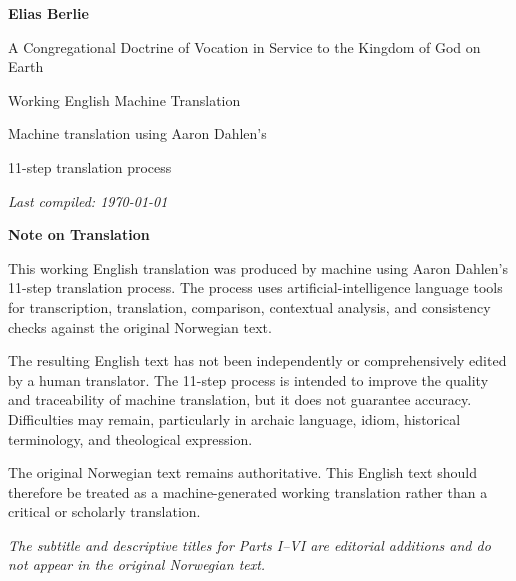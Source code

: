 \documentclass[12pt]{article}
\begin{document}
\begin{titlepage}
    \centering
    \vspace*{1.5in}

    {\LARGE\bfseries Elias Berlie \par}

	\vspace{0.35in}
	{A Congregational Doctrine of Vocation in Service to the Kingdom of God on Earth\par}




    \vfill

    {\large Working English Machine Translation\par}
    \vspace{0.15in}

    {\small Machine translation using Aaron Dahlen's \par}
    {\small 11-step translation process\par}

    \vspace{0.15in}
	
	\noindent\textit{Last compiled: \today}

\end{titlepage}



\pagestyle{plain}
\tableofcontents
\newpage


\textbf{Note on Translation}

This working English translation was produced by machine using Aaron Dahlen's 11-step translation process. The process uses artificial-intelligence language tools for transcription, translation, comparison, contextual analysis, and consistency checks against the original Norwegian text.

The resulting English text has not been independently or comprehensively edited by a human translator. The 11-step process is intended to improve the quality and traceability of machine translation, but it does not guarantee accuracy. Difficulties may remain, particularly in archaic language, idiom, historical terminology, and theological expression.

The original Norwegian text remains authoritative. This English text should therefore be treated as a machine-generated working translation rather than a critical or scholarly translation.

\textit{The subtitle and descriptive titles for Parts I--VI are editorial
additions and do not appear in the original Norwegian text.}
\end{document}
